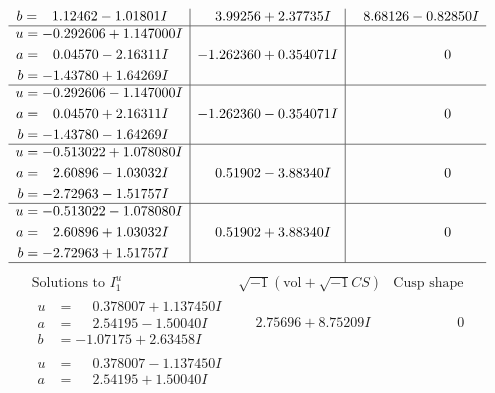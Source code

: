\documentclass[1p]{elsarticle_modified}
\theoremstyle{definition}
\newcommand{\I}{\sqrt{-1}}
\begin{document}
$$\begin{array}{c|c|c}
\begin{aligned}
b &= \phantom{-}1.12462 - 1.01801 I\end{aligned}
 & \phantom{-}3.99256 + 2.37735 I & \phantom{-}8.68126 - 0.82850 I \\ \hline\begin{aligned}
u &= -0.292606 + 1.147000 I \\
a &= \phantom{-}0.04570 - 2.16311 I \\
b &= -1.43780 + 1.64269 I\end{aligned}
 & -1.262360 + 0.354071 I & \phantom{-0.000000 } 0 \\ \hline\begin{aligned}
u &= -0.292606 - 1.147000 I \\
a &= \phantom{-}0.04570 + 2.16311 I \\
b &= -1.43780 - 1.64269 I\end{aligned}
 & -1.262360 - 0.354071 I & \phantom{-0.000000 } 0 \\ \hline\begin{aligned}
u &= -0.513022 + 1.078080 I \\
a &= \phantom{-}2.60896 - 1.03032 I \\
b &= -2.72963 - 1.51757 I\end{aligned}
 & \phantom{-}0.51902 - 3.88340 I & \phantom{-0.000000 } 0 \\ \hline\begin{aligned}
u &= -0.513022 - 1.078080 I \\
a &= \phantom{-}2.60896 + 1.03032 I \\
b &= -2.72963 + 1.51757 I\end{aligned}
 & \phantom{-}0.51902 + 3.88340 I & \phantom{-0.000000 } 0\\
 \hline 
 \end{array}$$\newpage$$\begin{array}{c|c|c}  
\text{Solutions to }I^u_{1}& \I (\text{vol} + \sqrt{-1}CS) & \text{Cusp shape}\\
 \hline 
\begin{aligned}
u &= \phantom{-}0.378007 + 1.137450 I \\
a &= \phantom{-}2.54195 - 1.50040 I \\
b &= -1.07175 + 2.63458 I\end{aligned}
 & \phantom{-}2.75696 + 8.75209 I & \phantom{-0.000000 } 0 \\ \hline\begin{aligned}
u &= \phantom{-}0.378007 - 1.137450 I \\
a &= \phantom{-}2.54195 + 1.50040 I \\

\end{aligned}
\end{array}$$
\end{document}

